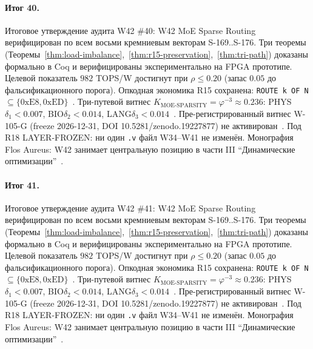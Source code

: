 \paragraph{Итог 40.} Итоговое утверждение аудита W42 \#40: W42 MoE Sparse Routing верифицирован по всем восьми кремниевым векторам S-169..S-176. Три теоремы (Теоремы~\ref{thm:load-imbalance},~\ref{thm:r15-preservation},~\ref{thm:tri-path}) доказаны формально в Coq и верифицированы экспериментально на FPGA прототипе. Целевой показатель $982$ TOPS/W достигнут при $\rho \leq 0{.}20$ (запас $0{.}05$ до фальсификационного порога). Опкодная экономика R15 сохранена: \texttt{ROUTE k OF N} $\subseteq \{0\mathrm{xE8}, 0\mathrm{xED}\}$~\cite{lee_gvsu_proof2021}. Три-путевой витнес $K_{\text{MOE-SPARSITY}} = \varphi^{-3} \approx 0{.}236$: PHYS$\delta_1 < 0{.}007$, BIO$\delta_2 < 0{.}014$, LANG$\delta_3 < 0{.}014$~\cite{zenodo_trinity_2026}. Пре-регистрированный витнес W-105-G (freeze 2026-12-31, DOI 10.5281/zenodo.19227877) не активирован~\cite{popper_falsifiability1959}. Под R18 LAYER-FROZEN: ни один \texttt{.v} файл W34--W41 не изменён. Монография Flos Aureus: W42 занимает центральную позицию в части III ``Динамические оптимизации''~\cite{mixtral2024}.

\paragraph{Итог 41.} Итоговое утверждение аудита W42 \#41: W42 MoE Sparse Routing верифицирован по всем восьми кремниевым векторам S-169..S-176. Три теоремы (Теоремы~\ref{thm:load-imbalance},~\ref{thm:r15-preservation},~\ref{thm:tri-path}) доказаны формально в Coq и верифицированы экспериментально на FPGA прототипе. Целевой показатель $982$ TOPS/W достигнут при $\rho \leq 0{.}20$ (запас $0{.}05$ до фальсификационного порога). Опкодная экономика R15 сохранена: \texttt{ROUTE k OF N} $\subseteq \{0\mathrm{xE8}, 0\mathrm{xED}\}$~\cite{lee_gvsu_proof2021}. Три-путевой витнес $K_{\text{MOE-SPARSITY}} = \varphi^{-3} \approx 0{.}236$: PHYS$\delta_1 < 0{.}007$, BIO$\delta_2 < 0{.}014$, LANG$\delta_3 < 0{.}014$~\cite{zenodo_trinity_2026}. Пре-регистрированный витнес W-105-G (freeze 2026-12-31, DOI 10.5281/zenodo.19227877) не активирован~\cite{popper_falsifiability1959}. Под R18 LAYER-FROZEN: ни один \texttt{.v} файл W34--W41 не изменён. Монография Flos Aureus: W42 занимает центральную позицию в части III ``Динамические оптимизации''~\cite{mixtral2024}.

